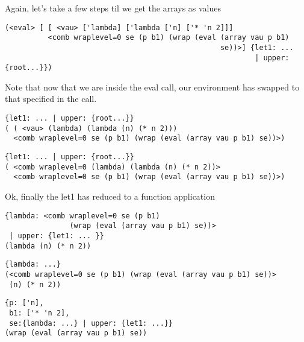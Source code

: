 \documentclass{beamer}
\begin{document}
\begin{frame}[fragile]
Again, let's take a few steps til we get the arrays as values
\footnotesize
\begin{verbatim}
(<eval> [ [ <vau> ['lambda] ['lambda ['n] ['* 'n 2]]]
          <comb wraplevel=0 se (p b1) (wrap (eval (array vau p b1)
		                                          se))>] {let1: ...
												          | upper: {root...}})
\end{verbatim}
\end{frame}

\begin{frame}[fragile]
Note that now that we are inside the eval call, our environment has swapped
to that specified in the call.
\footnotesize
\begin{verbatim}
{let1: ... | upper: {root...}}
( ( <vau> (lambda) (lambda (n) (* n 2)))
  <comb wraplevel=0 se (p b1) (wrap (eval (array vau p b1) se))>)
\end{verbatim}
\end{frame}

\begin{frame}[fragile]
\footnotesize
\begin{verbatim}
{let1: ... | upper: {root...}}
( <comb wraplevel=0 (lambda) (lambda (n) (* n 2))>
  <comb wraplevel=0 se (p b1) (wrap (eval (array vau p b1) se))>)
\end{verbatim}
Ok, finally the let1 has reduced to a function application
\end{frame}

\begin{frame}[fragile]
\footnotesize
\begin{verbatim}
{lambda: <comb wraplevel=0 se (p b1)
               (wrap (eval (array vau p b1) se))>
 | upper: {let1: ... }}
(lambda (n) (* n 2))
\end{verbatim}
\end{frame}

\begin{frame}[fragile]
\footnotesize
\begin{verbatim}
{lambda: ...}
(<comb wraplevel=0 se (p b1) (wrap (eval (array vau p b1) se))>
 (n) (* n 2))
\end{verbatim}
\end{frame}

\begin{frame}[fragile]
\footnotesize
\begin{verbatim}
{p: ['n],
 b1: ['* 'n 2],
 se:{lambda: ...} | upper: {let1: ...}}
(wrap (eval (array vau p b1) se))
\end{verbatim}
\end{frame}
\end{document}
